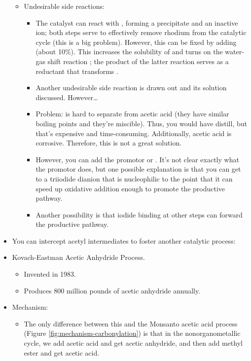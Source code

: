 \documentclass[../notes.tex]{subfiles}
\begin{document}
\begin{itemize}
\begin{itemize}
        \item Undesirable side reactions:
        \begin{itemize}
            \item The catalyst can react with , forming a  precipitate and an  inactive ion; both steps serve to effectively remove rhodium from the catalytic cycle (this is a big problem). However, this can be fixed by adding  (about 10\%). This increases the solubility of  and turns on the water-gas shift reaction ; the  product of the latter reaction serves as a reductant that transforms .
            \item Another undesirable side reaction is drawn out and its solution discussed. However\dots
            \item Problem:  is hard to separate from acetic acid (they have similar boiling points and they're miscible). Thus, you would have distill, but that's expensive and time-consuming. Additionally, acetic acid is corrosive. Therefore, this is not a great solution.
            \item However, you can add the promotor  or . It's not clear exactly what the promotor does, but one possible explanation is that you can get to a triiodide dianion that is nucleophilic to the point that it can speed up oxidative addition enough to promote the productive pathway.
            \item Another possibility is that iodide binding at other steps can forward the productive pathway.
        \end{itemize}
    \end{itemize}
    \item You can intercept acetyl intermediates to foster another catalytic process:
    \item Kovach-Eastman Acetic Anhydride Process.
    \begin{itemize}
        \item Invented in 1983.
        \item Produces 800 million pounds of acetic anhydride annually.
    \end{itemize}
    \item Mechanism:
    \begin{itemize}
        \item The only difference between this and the Monsanto acetic acid process (Figure \ref{fig:mechanism-carbonylation}) is that in the nonorganometallic cycle, we add acetic acid and get acetic anhydride, and then add methyl ester and get acetic acid.

\end{itemize}
\end{itemize}
\end{document}
